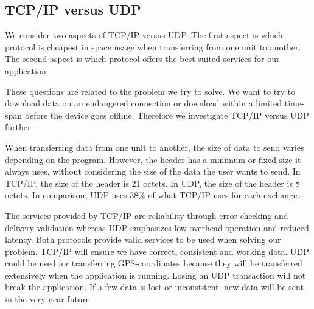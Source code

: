 \subsection{TCP/IP versus UDP}
We consider two aspects of TCP/IP versus UDP. The first aspect is which protocol is cheapest in space usage when transferring from one unit to another. The second aspect is which protocol offers the best suited services for our application.

These questions are related to the problem we try to solve. We want to try to download data on an endangered connection or download within a limited time-span before the device goes offline. Therefore we investigate TCP/IP versus UDP further.

When transferring data from one unit to another, the size of data to send varies depending on the program. However, the header has a minimum or fixed size it always uses, without considering the size of the data the user wants to send. In TCP/IP, the size of the header is 21 octets\cite{tcpdesc}. In UDP, the size of the header is 8 octets\cite{udpdesc}. In comparison, UDP uses 38\% of what TCP/IP uses for each exchange.

The services provided by TCP/IP are reliability through error checking and delivery validation whereas UDP emphasizes low-overhead operation and reduced latency\cite{wiki-tcp}. Both protocols provide valid services to be used when solving our problem. TCP/IP will ensure we have correct, consistent and working data. UDP could be used for transferring GPS-coordinates because they will be transferred extensively when the application is running. Losing an UDP transaction will not break the application. If a few data is lost or inconsistent, new data will be sent in the very near future.
